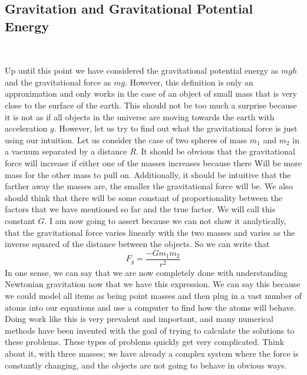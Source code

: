 \documentclass{article}[gray]
\numberwithin{equation}{subsection}
\begin{document}
\subsection{Gravitation and Gravitational Potential Energy}
\
\
\
\
\newline
Up until this point we have considered the gravitational potential energy as $mgh$ and the gravitational force as $mg$. However, this definition is only an approximation and only works in the case of an object of small mass that is very close to the surface of the earth. This should not be too much a surprise because it is not as if all objects in the universe are moving towards the earth with acceleration $g$. However, let us try to find out what the gravitational force is just using our intuition. Let us consider the case of two spheres of mass $m_1$ and $m_2$ in a vacuum separated by a distance $R$. It should be obvious that the gravitational force will increase if either one of the masses increases because there Will be more mass for the other mass to pull on. Additionally, it should be intuitive that the farther away the masses are, the smaller the gravitational force will be. We also should think that there will be some constant of proportionality between the factors that we have mentioned so far and the true factor. We will call this constant $G$. I am now going to assert because we can not show it analytically, that the gravitational force varies linearly with the two masses and varies as the inverse squared of the distance between the objects. So we can write that \begin{equation}F_g=\frac{-G m_1 m_2}{r^2}\end{equation} In one sense, we can say that we are now completely done with understanding Newtonian gravitation now that we have this expression. We can say this because we could model all items as being point masses and then plug in a vast number of atoms into our equations and use a computer to find how the atoms will behave. Doing work like this is very prevalent and important, and many numerical methods have been invented with the goal of trying to calculate the solutions to these problems. 
These types of problems quickly get very complicated. Think about it, with three masses; we have already a complex system where the force is constantly changing, and the objects are not going to behave in obvious ways.
\end{document}
